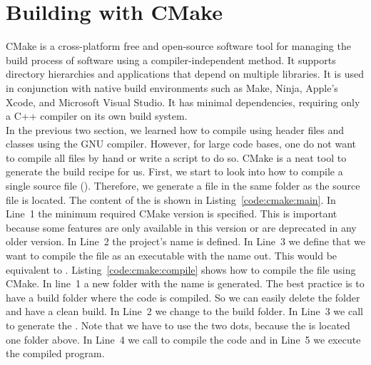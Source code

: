\section{Building with CMake}
\label{sec:cmake}
CMake is a cross-platform free and open-source software tool for managing the build process of software using a compiler-independent method. It supports directory hierarchies and applications that depend on multiple libraries. It is used in conjunction with native build environments such as Make, Ninja, Apple's Xcode, and Microsoft Visual Studio. It has minimal dependencies, requiring only a C++ compiler on its own build system. \\

In the previous two section, we learned how to compile using header files and classes using the GNU compiler. However, for large code bases, one do not want to compile all files by hand or write a script to do so. CMake is a neat tool to generate the build recipe for us. First, we start to look into how to compile a single source file (). Therefore, we generate a  file in the same folder as the source file is located. The content of the  is shown in Listing~\ref{code:cmake:main}. In Line~1 the minimum required CMake version is specified. This is important because some features are only available in this version or are deprecated in any older version. In Line~2 the project's name is defined. In Line~3 we define that we want to compile the file  as an executable with the name out. This would be equivalent to . Listing~\ref{code:cmake:compile} shows how to compile the  file using CMake. In line~1 a new folder with the name  is generated. The best practice is to have a build folder where the code is compiled. So we can easily delete the folder and have a clean build. In Line~2 we change to the build folder. In Line~3 we call  to generate the . Note that we have to use the two dots, because the  is located one folder above. In Line~4 we call  to compile the code and in Line~5 we execute the compiled program. \\

